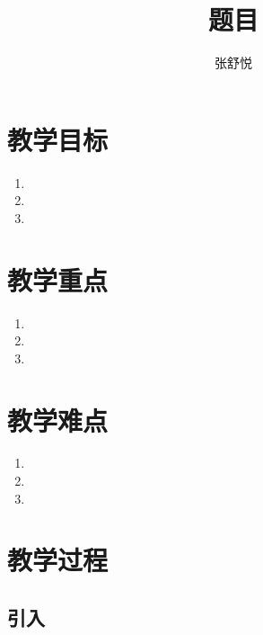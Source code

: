 \documentclass{article}
\begin{document}
\begin{CJK}{UTF8}{gkai}

\title{题目}
\date{}
\author{张舒悦}
\maketitle

\section{教学目标}
\begin{enumerate}
\item 
\item 
\item 
\end{enumerate}

\section{教学重点}
\begin{enumerate}
\item 
\item 
\item 
\end{enumerate}

\section{教学难点}
\begin{enumerate}
\item 
\item 
\item 
\end{enumerate}

\section{教学过程}

\subsection{引入}
\subsubsection{}
\subsubsection{}

\subsection{}

\end{CJK}
\end{document}
